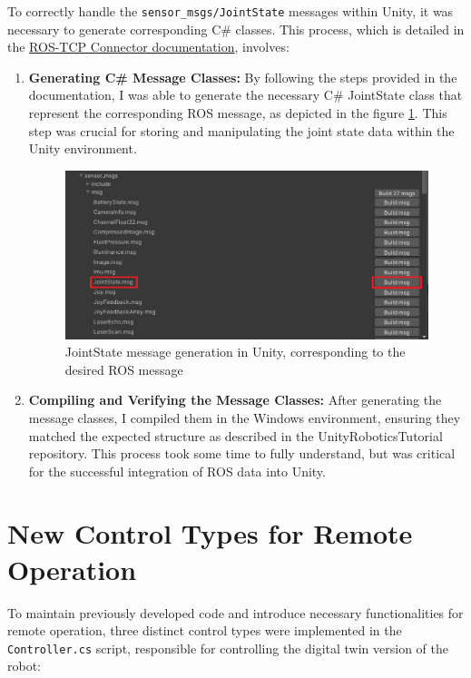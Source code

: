     To correctly handle the \texttt{sensor\_msgs/JointState} messages within Unity, it was necessary to generate corresponding C\# classes. This process, which is detailed in the \href{https://github.com/Unity-Technologies/ROS-TCP-Connector/blob/main/MessageGeneration.md}{ROS-TCP Connector documentation}, involves:
    \begin{enumerate}
        \item \textbf{Generating C\# Message Classes:} By following the steps provided in the documentation, I was able to generate the necessary C\# JointState class that represent the corresponding ROS message, as depicted in the figure \ref{fig:unityjoint_state_message}. This step was crucial for storing and manipulating the joint state data within the Unity environment.
        \begin{figure}
        \centering
        \includegraphics[width=0.75\linewidth]{figs/unityjoint_state_message.png}
        \caption{JointState message generation in Unity, corresponding to the desired ROS message}
        \label{fig:unityjoint_state_message}
        \end{figure}
        \item \textbf{Compiling and Verifying the Message Classes:} After generating the message classes, I compiled them in the Windows environment, ensuring they matched the expected structure as described in the UnityRoboticsTutorial repository. This process took some time to fully understand, but was critical for the successful integration of ROS data into Unity.
    \end{enumerate}
    
    \section{New Control Types for Remote Operation}
    To maintain previously developed code and introduce necessary functionalities for remote operation, three distinct control types were implemented in the \texttt{Controller.cs} script, responsible for controlling the digital twin version of the robot:
    
